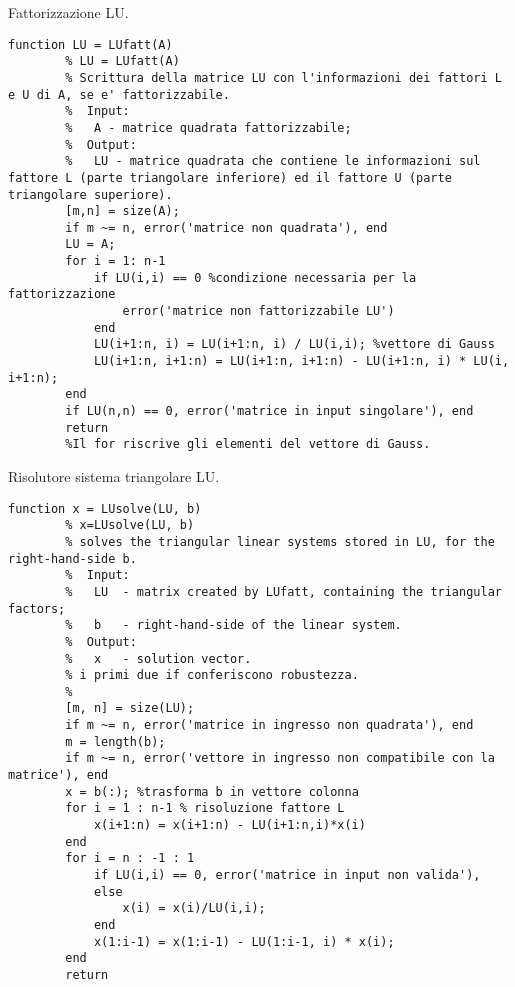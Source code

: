 \begin{algorithm}
\caption{Fattorizzazione LU.}
\label{alg:LUfatt}
    \begin{lstlisting}[style=Matlab-editor]
        function LU = LUfatt(A)
        % LU = LUfatt(A)
        % Scrittura della matrice LU con l'informazioni dei fattori L e U di A, se e' fattorizzabile.
        %  Input:
        %   A - matrice quadrata fattorizzabile;
        %  Output:
        %   LU - matrice quadrata che contiene le informazioni sul fattore L (parte triangolare inferiore) ed il fattore U (parte triangolare superiore).
        [m,n] = size(A);
        if m ~= n, error('matrice non quadrata'), end
        LU = A;
        for i = 1: n-1
            if LU(i,i) == 0 %condizione necessaria per la fattorizzazione
                error('matrice non fattorizzabile LU')
            end
            LU(i+1:n, i) = LU(i+1:n, i) / LU(i,i); %vettore di Gauss
            LU(i+1:n, i+1:n) = LU(i+1:n, i+1:n) - LU(i+1:n, i) * LU(i, i+1:n);
        end
        if LU(n,n) == 0, error('matrice in input singolare'), end
        return
        %Il for riscrive gli elementi del vettore di Gauss. 
    \end{lstlisting}
\end{algorithm}

\begin{algorithm}
\caption{Risolutore sistema triangolare LU.}
\label{alg:LUsolve}
    \begin{lstlisting}[style=Matlab-editor]
        function x = LUsolve(LU, b)
        % x=LUsolve(LU, b)
        % solves the triangular linear systems stored in LU, for the right-hand-side b.
        %  Input:
        %   LU  - matrix created by LUfatt, containing the triangular factors;
        %   b   - right-hand-side of the linear system.
        %  Output:
        %   x   - solution vector.
        % i primi due if conferiscono robustezza.
        %
        [m, n] = size(LU);
        if m ~= n, error('matrice in ingresso non quadrata'), end
        m = length(b);
        if m ~= n, error('vettore in ingresso non compatibile con la matrice'), end
        x = b(:); %trasforma b in vettore colonna
        for i = 1 : n-1 % risoluzione fattore L
            x(i+1:n) = x(i+1:n) - LU(i+1:n,i)*x(i)
        end
        for i = n : -1 : 1
            if LU(i,i) == 0, error('matrice in input non valida'),
            else
                x(i) = x(i)/LU(i,i);
            end
            x(1:i-1) = x(1:i-1) - LU(1:i-1, i) * x(i);
        end
        return
    \end{lstlisting}
\end{algorithm}

